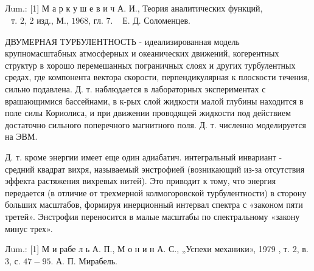 \documentclass[10pt]{article}
\begin{document}
Лum.: [1] М а р к у ш е в и ч А. И., Теория аналитических функций, $\begin{array}{ll}\text { т. 2, } 2 \text { изд., М., 1968, гл. } 7 . & \text { Е. Д. Соломенцев. }\end{array}$



ДВУМЕРНАЯ ТУРБУЛЕНТНОСТЬ - идеализированная модель крупномасштабных атмосферных и океанических движений, когерентных структур в хорошо перемешанных пограничных слоях и других турбулентных средах, где компонента вектора скорости, перпендикулярная к плоскости течения, сильно подавлена. Д. т. наблюдается в лабораторных экспериментах с врашающимися бассейнами, в к-рых слой жидкости малой глубины находится в поле силы Кориолиса, и при движении проводящей жидкости под действием достаточно сильного поперечного магнитного поля. Д. т. численно моделируется на ЭВМ.



Д. т. кроме энергии имеет еще один адиабатич. интегральный инвариант - средний квадрат вихря, называемый энстрофией (возникающий из-за отсутствия эффекта растяжения вихревых нитей). Это приводит к тому, что энергия передается (в отличие от трехмерной колмогоровской турбулентности) в сторону больших масштабов, формируя инерционный интервал спектра с «законом пяти третей». Энстрофия переносится в малые масштабы по спектральному «закону минус трех».



Лum.: [1] М и рабе л ь А. П., М о н и н А. С., „Успехи механики», 1979 , т. 2, в. 3, с. $47-95$. А. П. Мирабель.
\end{document}
